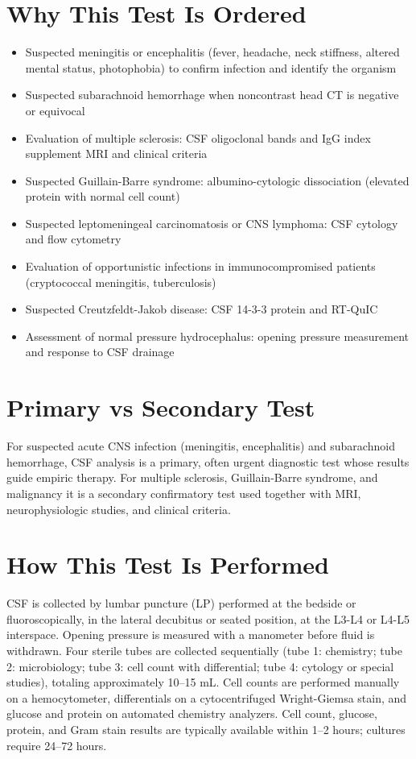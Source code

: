 \section*{Why This Test Is Ordered}
\begin{itemize}
  \item Suspected meningitis or encephalitis (fever, headache, neck stiffness, altered mental status, photophobia) to confirm infection and identify the organism \cite{tunkel2004practice}
  \item Suspected subarachnoid hemorrhage when noncontrast head CT is negative or equivocal \cite{perry2013clinical}
  \item Evaluation of multiple sclerosis: CSF oligoclonal bands and IgG index supplement MRI and clinical criteria
  \item Suspected Guillain-Barre syndrome: albumino-cytologic dissociation (elevated protein with normal cell count)
  \item Suspected leptomeningeal carcinomatosis or CNS lymphoma: CSF cytology and flow cytometry
  \item Evaluation of opportunistic infections in immunocompromised patients (cryptococcal meningitis, tuberculosis)
  \item Suspected Creutzfeldt-Jakob disease: CSF 14-3-3 protein and RT-QuIC
  \item Assessment of normal pressure hydrocephalus: opening pressure measurement and response to CSF drainage
\end{itemize}
\section*{Primary vs Secondary Test}
For suspected acute CNS infection (meningitis, encephalitis) and subarachnoid hemorrhage, CSF analysis is a primary, often urgent diagnostic test whose results guide empiric therapy. For multiple sclerosis, Guillain-Barre syndrome, and malignancy it is a secondary confirmatory test used together with MRI, neurophysiologic studies, and clinical criteria.
\section*{How This Test Is Performed}
CSF is collected by lumbar puncture (LP) performed at the bedside or fluoroscopically, in the lateral decubitus or seated position, at the L3-L4 or L4-L5 interspace. Opening pressure is measured with a manometer before fluid is withdrawn. Four sterile tubes are collected sequentially (tube 1: chemistry; tube 2: microbiology; tube 3: cell count with differential; tube 4: cytology or special studies), totaling approximately 10--15 mL. Cell counts are performed manually on a hemocytometer, differentials on a cytocentrifuged Wright-Giemsa stain, and glucose and protein on automated chemistry analyzers. Cell count, glucose, protein, and Gram stain results are typically available within 1--2 hours; cultures require 24--72 hours.

